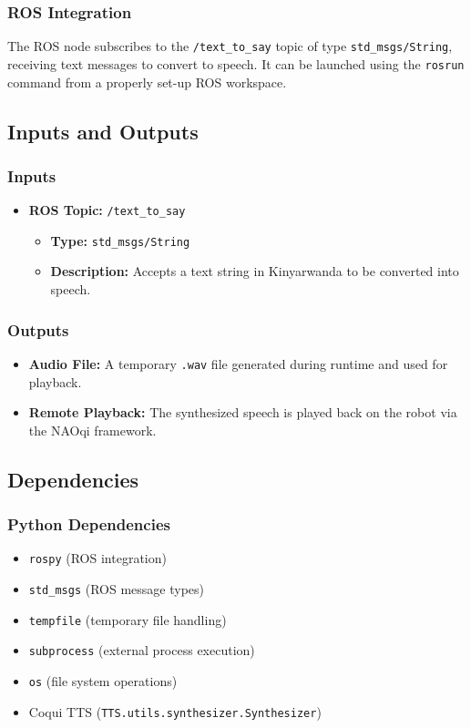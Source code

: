 \documentclass{CSSRforAfrica}
\begin{document}
\subsubsection{ROS Integration}
The ROS node subscribes to the \texttt{/text\_to\_say} topic of type \texttt{std\_msgs/String}, receiving text messages to convert to speech. It can be launched using the \texttt{rosrun} command from a properly set-up ROS workspace.

\subsection{Inputs and Outputs}

\subsubsection{Inputs}
\begin{itemize}
    \item \textbf{ROS Topic:} \texttt{/text\_to\_say}
    \begin{itemize}
        \item \textbf{Type:} \texttt{std\_msgs/String}
        \item \textbf{Description:} Accepts a text string in Kinyarwanda to be converted into speech.
    \end{itemize}
\end{itemize}

\subsubsection{Outputs}
\begin{itemize}
    \item \textbf{Audio File:} A temporary \texttt{.wav} file generated during runtime and used for playback.
    \item \textbf{Remote Playback:} The synthesized speech is played back on the robot via the NAOqi framework.
\end{itemize}

\subsection{Dependencies}

\subsubsection{Python Dependencies}
\begin{itemize}
    \item \texttt{rospy} (ROS integration)
    \item \texttt{std\_msgs} (ROS message types)
    \item \texttt{tempfile} (temporary file handling)
    \item \texttt{subprocess} (external process execution)
    \item \texttt{os} (file system operations)
    \item Coqui TTS (\texttt{TTS.utils.synthesizer.Synthesizer})
\end{itemize}
\end{document}

